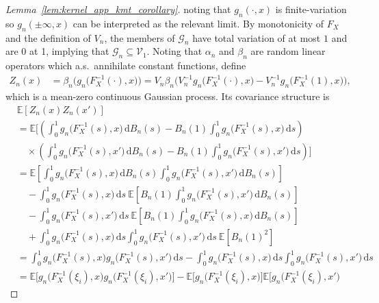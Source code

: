 \documentclass[11pt,lof]{puthesis}
\newcommand{\E}{\ensuremath{\mathbb{E}}}
\newcommand{\cG}{\ensuremath{\mathcal{G}}}
\newcommand{\cV}{\ensuremath{\mathcal{V}}}
\newcommand{\diff}[1]{\,\mathrm{d}#1}
\theoremstyle{break}
\theoremstyle{proof}
\newtheorem{proof}{Proof}
\begin{document}
\begin{proof}[Lemma~\ref{lem:kernel_app_kmt_corollary}]
  noting that $g_n(\cdot,x)$
  is finite-variation so
  $g_n(\pm \infty, x)$
  can be interpreted as
  the relevant limit.
  By monotonicity of $F_X$ and the definition of $V_n$,
  the members of $\cG_n$ have total variation of at most $1$
  and are 0 at 1, implying that
  $\cG_n \subseteq \cV_1$.
  Noting that $\alpha_n$ and $\beta_n$ are random
  linear operators which a.s.\ annihilate
  constant functions,
  define
  \begin{align*}
    Z_n(x)
    &=
    \beta_n \Big(g_n\big(F_X^{-1}(\cdot), x\big)\Big)
    = V_n \beta_n \Big(
      V_n^{-1} g_n\big(F_X^{-1}(\cdot), x\big)
      - V_n^{-1} g_n\big(F_X^{-1}(1), x\big)
    \Big),
  \end{align*}
  which is a mean-zero continuous Gaussian process.
  Its covariance structure is
  \begin{align*}
    &\E[Z_n(x) Z_n(x')] \\
    &=
    \E\bigg[
      \left(
        \int_0^1 g_n\big(F_X^{-1}(s),x\big) \diff{B_n(s)}
        - B_n(1) \int_0^1 g_n\big(F_X^{-1}(s),x\big) \diff{s}
      \right) \\
      &\quad\times
      \left(
        \int_0^1 g_n\big(F_X^{-1}(s),x'\big) \diff{B_n(s)}
        - B_n(1) \int_0^1 g_n\big(F_X^{-1}(s),x'\big) \diff{s}
      \right)
    \bigg] \\
    &=
    \E\left[
      \int_0^1 g_n\big(F_X^{-1}(s),x\big) \diff{B_n(s)}
      \int_0^1 g_n\big(F_X^{-1}(s),x'\big) \diff{B_n(s)}
    \right] \\
    &\quad- \int_0^1 g_n\big(F_X^{-1}(s),x\big) \diff{s} \
    \E\left[
      B_n(1) \int_0^1 g_n\big(F_X^{-1}(s),x'\big) \diff{B_n(s)}
    \right] \\
    &\quad-
    \int_0^1 g_n\big(F_X^{-1}(s),x'\big) \diff{s} \
    \E\left[
      B_n(1) \int_0^1 g_n\big(F_X^{-1}(s),x\big) \diff{B_n(s)}
    \right] \\
    &\quad+
    \int_0^1 g_n\big(F_X^{-1}(s),x\big) \diff{s}
    \int_0^1 g_n\big(F_X^{-1}(s),x'\big) \diff{s} \
    \E\left[
      B_n(1)^2
    \right] \\
    &=
    \int_0^1 g_n\big(F_X^{-1}(s),x\big)
    g_n\big(F_X^{-1}(s),x'\big) \diff{s}
    - \int_0^1 g_n\big(F_X^{-1}(s),x\big) \diff{s}
    \int_0^1 g_n\big(F_X^{-1}(s),x'\big) \diff{s} \\
    &=
    \E\Big[
      g_n\big(F_X^{-1}(\xi_i), x\big)
      g_n\big(F_X^{-1}(\xi_i), x'\big)
    \Big]
    - \E\Big[
      g_n\big(F_X^{-1}(\xi_i), x\big)
    \Big]
    \E\Big[
      g_n\big(F_X^{-1}(\xi_i), x'\big)

\end{align*}
\end{proof}
\end{document}
